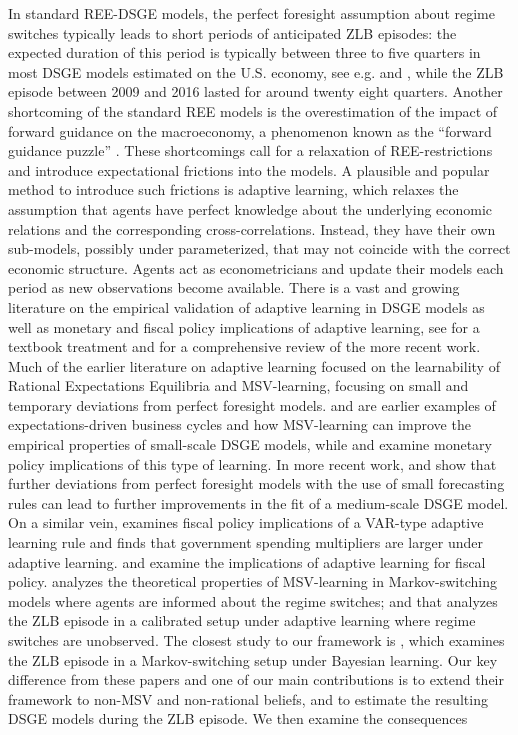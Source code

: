 \documentclass[12pt,reqno]{article}
\numberwithin{equation}{section}
\begin{document}
In standard REE-DSGE models, the perfect foresight assumption about regime switches typically leads to short periods of anticipated ZLB episodes: the expected duration of this period is typically between three to five quarters in most DSGE models estimated on the U.S. economy, see e.g. \cite{linde2017estimation} and \cite{ji2016government}, while the ZLB episode between 2009 and 2016 lasted for around twenty eight quarters. Another shortcoming of the standard REE models is the overestimation of the impact of forward guidance on the macroeconomy, a phenomenon known as the “forward guidance puzzle” \cite{del2012forward}. These shortcomings call for a relaxation of REE-restrictions and introduce expectational frictions into the models. A plausible and popular method to introduce such frictions is adaptive learning, which relaxes the assumption that agents have perfect knowledge about the underlying economic relations and  the corresponding cross-correlations. Instead, they have their own sub-models, possibly under parameterized, that may not coincide with the correct economic structure. Agents act as econometricians and update their models each period as new observations become available. There is a vast and growing literature on the empirical validation of adaptive learning in DSGE models as well as monetary and fiscal policy implications of adaptive learning, see \cite{evans2012learning} for a textbook treatment and \cite{woodford2013macroeconomic} for a comprehensive review of the more recent work. Much of the earlier literature on adaptive learning focused on the learnability of Rational Expectations Equilibria and MSV-learning, focusing on small and  temporary deviations from perfect foresight models.  \cite{milani2007expectations} and \cite{eusepi2011expectations} are earlier examples of expectations-driven business cycles and how MSV-learning can improve the empirical properties of small-scale DSGE models, while \cite{bullard2002learning} and \cite{bullard2014does} examine monetary policy implications of this type of learning. In more recent work,   \cite{slobodyan2012blearning} and \cite{slobodyan2012alearning} show that further deviations from perfect foresight models with the use of small forecasting rules can lead to further improvements in the fit of a medium-scale DSGE model. On a similar vein, \cite{quaghebeur2018learning} examines fiscal policy implications of a VAR-type adaptive learning rule and finds that government spending multipliers are larger under adaptive learning. \cite{evans2008liquidity} and  \cite{evans201011} examine the implications of adaptive learning for fiscal policy. \cite{branch2013adaptive} analyzes the theoretical properties of MSV-learning in Markov-switching models where agents are informed about the regime switches; and \cite{lansing2018endogenous} that analyzes the ZLB episode in a calibrated setup under adaptive learning where regime switches are unobserved. The closest study to our framework is \cite{gust2018forward}, which examines the ZLB episode in a Markov-switching setup under Bayesian learning. Our key difference from these papers and one of our main contributions is to extend their framework to non-MSV and non-rational beliefs, and to estimate the resulting DSGE models during the ZLB episode. We then examine the consequences 
\end{document}
